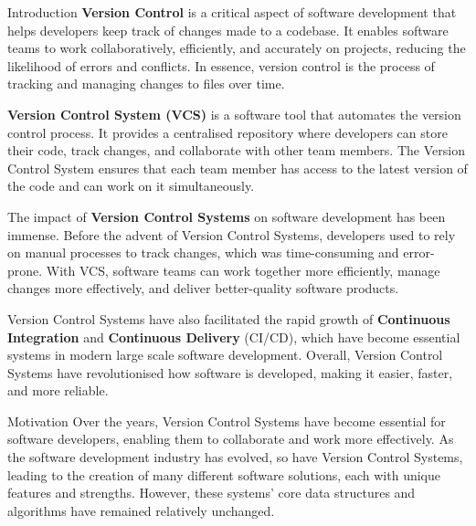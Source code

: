 \documentclass[a4paper,12pt]{article}
\makeatletter
\renewcommand{\section}{\needspace{.25\textheight} \@startsection{section}{1}{0mm}
  {\baselineskip}
  {\baselineskip}{\Large\bfseries\scshape}}
\makeatother
\begin{document}
\tableofcontents

\newpage
{}

\section{Introduction}
\textbf{Version Control} is a critical aspect of software development that helps developers keep track of changes made to a codebase. It enables software teams to work collaboratively, efficiently, and accurately on projects, reducing the likelihood of errors and conflicts. In essence, version control is the process of tracking and managing changes to files over time.
\vspace{9pt}

\textbf{Version Control System (VCS)} is a software tool that automates the version control process. It provides a centralised repository where developers can store their code, track changes, and collaborate with other team members. The Version Control System ensures that each team member has access to the latest version of the code and can work on it simultaneously.
\vspace{9pt}

The impact of \textbf{Version Control Systems} on software development has been immense. Before the advent of Version Control Systems, developers used to rely on manual processes to track changes, which was time-consuming and error-prone. With VCS, software teams can work together more efficiently, manage changes more effectively, and deliver better-quality software products.
\vspace{9pt}

Version Control Systems have also facilitated the rapid growth of \textbf{Continuous Integration} and \textbf{Continuous Delivery} (CI/CD), which have become essential systems in modern large scale software development. Overall, Version Control Systems have revolutionised how software is developed, making it easier, faster, and more reliable.

\section{Motivation}
Over the years, Version Control Systems have become essential for software developers, enabling them to collaborate and work more effectively. As the software development industry has evolved, so have Version Control Systems, leading to the creation of many different software solutions, each with unique features and strengths. However, these systems' core data structures and algorithms have remained relatively unchanged.
\vspace{9pt}
\end{document}
